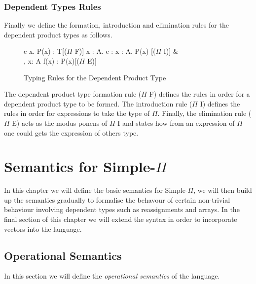 \documentclass[a4paper,12pt]{report}
\begin{document}
\subsection{Dependent Types Rules}
Finally we define the formation, introduction and elimination rules for 
the dependent product types as follows.

\begin{figure}[H]
  \begin{center}
    \begin{tabular} {c}
        {\Gamma \vdash \Pi x. P(x) : T}[($\Pi$ F)] \text{ }
        {\Gamma \vdash \lambda x : A. e : \Pi x : A. P(x) }[($\Pi$ I)] & \\
        {\Gamma, x: A \vdash f(x) : P(x)}[($\Pi$ E)] \text{ }
    \end{tabular}
  \end{center}
  \caption{Typing Rules for the Dependent Product Type}
\end{figure}

\par
The dependent product type formation rule ($\Pi$ F) defines the rules in order 
for a dependent product type to be formed. The introduction rule ($\Pi$ I) 
defines the rules in order for expressions to take the type of $\Pi$. Finally, 
the elimination rule ($\Pi$ E) acts as the modus ponens of $\Pi$ I and states 
how from an expression of $\Pi$ one could gets the expression of others type. 


\chapter{Semantics for Simple-$\Pi$}
In this chapter we will define the basic semantics for Simple-$\Pi$, we will 
then build up the semantics gradually to formalise the behavour of certain 
non-trivial behaviour involving dependent types such as reassignments and 
arrays. In the final section of this chapter we will extend the syntax in 
order to incorporate vectors into the language.

\section{Operational Semantics}
In this section we will define the \textit{operational semantics} 
\cite{operationalSemantics} of the language.
\end{document}
